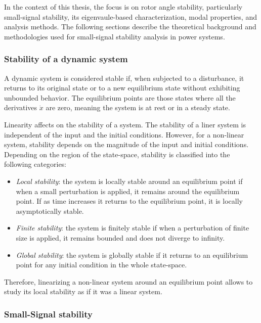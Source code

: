In the context of this thesis, the focus is on rotor angle stability, particularly small-signal stability, its eigenvaule-based characterization, 
modal properties, and analysis methods. The following sections describe the theoretical background and methodologies used for small-signal stability 
analysis in power systems. 

\subsubsection{Stability of a dynamic system}

A dynamic system is considered stable if, when subjected to a disturbance, it returns to its original state or to a new equilibrium state without
exhibiting unbounded behavior. The equilibrium points are those states where all the derivatives $\dot{x}$ are zero, meaning the system is at rest
or in a steady state. 

Linearity affects on the stability of a system. The stability of a liner system is independent of the input and the initial conditions.
However, for a non-linear system, stability depends on the magnitude of the input and initial conditions. Depending on the region of the state-space,
stability is classified into the following categories:

\begin{itemize}
  \item \textit{Local stability}: the system is locally stable around an equilibrium point if when a small perturbation is applied,
  it remains around the equilibrium point. If as time increases it returns to the equilibrium point, it is locally asymptotically stable\cite{StabilityAndControlKundur}.
  \item \textit{Finite stability}: the system is finitely stable if when a perturbation of finite size is applied, it remains bounded and does not diverge to infinity.
  \item \textit{Global stability}: the system is globally stable if it returns to an equilibrium point for any initial condition in the whole state-space.
\end{itemize}

Therefore, linearizing a non-linear system around an equilibrium point allows to study its local stability as if it was a linear system. 

\subsubsection{Small-Signal stability}

